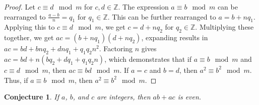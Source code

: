 \documentclass[11pt,titlepage]{article}		%
\def\Z{{\mathbb Z}}
\theoremstyle{theorem}
\newtheorem{conjecture}[theorem]{Conjecture}
\begin{document}
\begin{proof}
Let $c \equiv d \mod m$ for $c,d \in \Z$. The expression $a \equiv b \mod m$ can be rearranged to $\frac{a-b}{n} = q_1$ for $q_1 \in \Z$. This can be further rearranged to $a = b +nq_1$. Applying this to $c \equiv d \mod m$, we get $c = d +nq_2$ for $q_2 \in \Z$. Multiplying these together, we get $ac = (b +nq_1)(d+nq_2)$, expanding results in $ac = bd +bnq_2 + dnq_1 + q_1q_2n^2$. Factoring $n$ gives $ac = bd + n(bq_2 + dq_1 + q_1q_2n)$, which demonstrates that if $a \equiv b \mod m$ and $c \equiv d \mod m$, then $ ac \equiv bd \mod m$. If $a=c$ and $b=d$, then $a^2 \equiv b^2  \mod m$. Thus, if $a \equiv b \mod m$, then $a^2 \equiv b^2 \mod m$.
\end{proof}

\clearpage
 

\begin{conjecture}
    If $a$, $b$, and $c$ are integers, then $ab+ac$ is even.
\end{conjecture}
\end{document}
